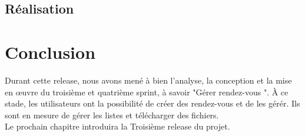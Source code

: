  \subsection{Réalisation}



\section*{Conclusion}
Durant cette release, nous avons mené à bien l'analyse, la conception et la mise en œuvre du troisième et quatrième sprint, à savoir "Gérer rendez-vous ". À ce stade, les utilisateurs ont la possibilité de créer des rendez-vous et de les gérér. Ils sont en mesure de gérer les listes et télécharger des fichiers.
\\ Le prochain chapitre introduira la Troisième release du projet.
\label{sec_Conclusion}



